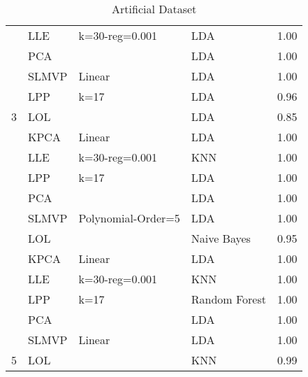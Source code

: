 \begin{table}
\begin{tabular}{llllr}
                                                & LLE            & k=30-reg=0.001     & LDA           & 1.00       \\
                                                & PCA            &                    & LDA           & 1.00       \\
                                                & SLMVP          & Linear             & LDA           & 1.00       \\
                                                & LPP            & k=17               & LDA           & 0.96       \\
        \multirow{-6}{*}{3}                     & LOL            &                    & LDA           & 0.85       \\
        \rowcolor{lightgray}                    & KPCA           & Linear             & LDA           & 1.00       \\
        \rowcolor{lightgray}                    & LLE            & k=30-reg=0.001     & KNN           & 1.00       \\
        \rowcolor{lightgray}                    & LPP            & k=17               & LDA           & 1.00       \\
        \rowcolor{lightgray}                    & PCA            &                    & LDA           & 1.00       \\
        \rowcolor{lightgray}                    & SLMVP          & Polynomial-Order=5 & LDA           & 1.00       \\
        \rowcolor{lightgray}\multirow{-6}{*}{4} & LOL            &                    & Naive Bayes   & 0.95       \\
                                                & KPCA           & Linear             & LDA           & 1.00       \\
                                                & LLE            & k=30-reg=0.001     & KNN           & 1.00       \\
                                                & LPP            & k=17               & Random Forest & 1.00       \\
                                                & PCA            &                    & LDA           & 1.00       \\
                                                & SLMVP          & Linear             & LDA           & 1.00       \\
        \multirow{-6}{*}{5}                     & LOL            &                    & KNN           & 0.99       \\
        \bottomrule
    \end{tabular}
    \caption{Artificial Dataset}
    \label{annex-tab:artificial-dataset}
\end{table}


